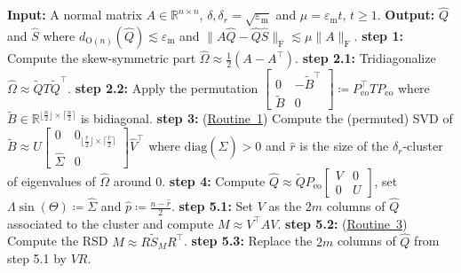 \documentclass[10pt,twoside,dvipsnames]{siamart1116}
\numberwithin{algorithm}{section}
\numberwithin{equation}{section}
\newcommand{\wordref}[2]{\hyperlink{#1}{#2}}
\begin{document}
\begin{algorithm}
	\caption{Floating point arithmetic algorithm for the real Schur decomposition of a normal matrix (\texttt{nrmschur})}
	\label{alg:schur_decomposition_floating}
	\begin{algorithmic}
	\STATE \textbf{Input:} A normal matrix $A\in\mathbb{R}^{n\times n}$, $\delta, \delta_r=\sqrt{\varepsilon_\mathrm{m}}$ and $\mu = \varepsilon_\mathrm{m} t$, $t\geq 1$.
	\STATE \textbf{Output:} $\widehat{Q}$ and $\widehat{S}$ where $d_{\mathrm{O}(n)}(\widehat{Q})\lesssim\varepsilon_\mathrm{m}$ and $\|A\widehat{Q} - \widehat{Q} \widehat{S}\|_\mathrm{F}\lesssim \mu \|A\|_\mathrm{F}$.
		\STATE \textbf{step 1:} Compute the skew-symmetric part $\widehat{\Omega}\approx \frac12(A-A^\top)$.
		\STATE \textbf{step 2.1:} Tridiagonalize $\widehat{\Omega} \approx \widetilde{Q} T \widetilde{Q}^\top$.
		\STATE \textbf{step 2.2:} Apply the permutation $\left[\begin{smallmatrix}
		0&-\widetilde{B}^\top \\
		\widetilde{B}&0
		\end{smallmatrix}\right]\coloneq P_{\mathrm{eo}}^\top T P_{\mathrm{eo}}$ where $\widetilde{B}\in\mathbb{R}^{\lfloor\frac{n}{2}\rfloor\times \lceil\frac{n}{2}\rceil}$ is bidiagonal.
		\STATE \textbf{step 3:}  (\wordref{oracle1}{Routine~1}) Compute the (permuted) SVD of  $\widetilde{B} \approx \widehat{U}\left[\begin{smallmatrix} 0&0_{\lfloor\frac{\widehat{r}}{2}\rfloor\times \lceil\frac{\widehat{r}}{2}\rceil}\\ \widehat{\Sigma}  &0 \end{smallmatrix}\right]\widehat{V}^\top $ where $\mathrm{diag}(\widehat{\Sigma})>0$ and $\widehat{r}$ is the size of the $\delta_r$-cluster of eigenvalues of $\widehat{\Omega}$ around 0.
		\STATE \textbf{step 4:} Compute $\widehat{Q}\approx \widetilde{Q} P_{\mathrm{eo}} \left[\begin{smallmatrix}
		V&0\\
		0&U\end{smallmatrix}\right]$, set $\Lambda \sin(\Theta) \coloneq \widehat{\Sigma}$ and $\widehat{p}\coloneq \frac{n-\widehat{r}}{2}$.
			\STATE \textbf{step 5.1:} Set $V$ as the $2m$ columns of $\widehat{Q}$ associated to the cluster and compute $M\approx V^\top AV$. 
			\STATE \textbf{step 5.2:} (\wordref{oracle3}{Routine~3}) Compute the RSD $M \approx R \widetilde{S}_{M} R^\top $.
			\STATE \textbf{step 5.3:} Replace the $2m$ columns of $\widehat{Q}$ from step 5.1 by $VR$.

\end{algorithmic}
\end{algorithm}
\end{document}
